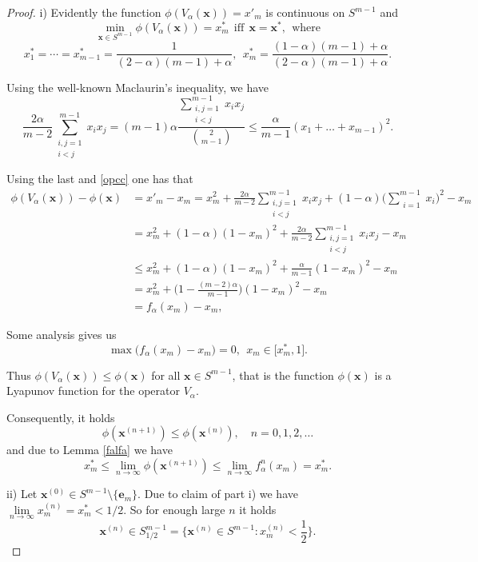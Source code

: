 \documentclass[11pt,reqno]{amsart}
\numberwithin{equation}{section} \setcounter{tocdepth}{1}
\begin{document}
\begin{proof}  i) Evidently the function $\phi(V_\alpha(\mathbf{x}))=x'_m$ is continuous on $S^{m-1}$ and
\[\min\limits_{\mathbf{x}\in S^{m-1}} \phi(V_\alpha(\mathbf{x})) =x_m^* \ \ \text{iff} \ \  \mathbf{x}=\mathbf{x}^*, \ \ \text{where}\]
\[x_1^*=\cdots=x_{m-1}^* =\frac{1}{ (2-\alpha)(m-1)+\alpha}, \ \ x_m^*=\frac{(1-\alpha)(m-1)+\alpha}{ (2-\alpha)(m-1)+\alpha}.\]

Using the well-known Maclaurin's inequality, we have
\[\frac{2\alpha}{m-2} \displaystyle\sum_{\substack{i,j=1\\ i<j}}^{m-1} x_ix_j =
(m-1)\alpha \frac{\displaystyle\sum_{\substack{i,j=1\\ i<j}}^{m-1} x_ix_j}{
\binom{2}{m-1}} \leq \frac{\alpha}{ m-1} (x_1+\dots+x_{m-1})^2.\]

Using the last and \eqref{opcc} one has that
\begin{align*}
\phi(V_\alpha(\mathbf{x}))-\phi(\mathbf{x})&=x'_m-x_m= x_m^2+
               \frac{2\alpha}{m-2}\displaystyle\sum_{\substack{i,j=1\\ i<j}}^{m-1} x_ix_j +
               (1-\alpha) \Big(\displaystyle\sum_{\substack{i=1}}^{m-1} x_i\Big)^2-x_m\\
&= x_m^2+(1-\alpha) (1-x_m)^2 +  \frac{2\alpha}{m-2}\displaystyle\sum_{\substack{i,j=1\\ i<j}}^{m-1} x_ix_j-x_m\\
&\leq x_m^2+(1-\alpha) (1-x_m)^2 +  \frac{\alpha}{m-1}(1-x_m)^2-x_m\\
&=x_m^2+\Big(1-\frac{(m-2)\alpha}{m-1}\Big) (1-x_m)^2-x_m\\
&= f_\alpha(x_m)-x_m,
\end{align*}

Some analysis gives us
\[\max  \Big(f_\alpha(x_m)-x_m\Big) =0, \ \ x_m\in \Big[x^*_m,1\Big]. \]


Thus $\phi(V_\alpha(\mathbf{x}))\leq \phi(\mathbf{x}) $ for all $\mathbf{x}\in S^{m-1}$, that is
the function $\phi(\mathbf{x})$ is a Lyapunov function for the operator $V_\alpha$.

Consequently, it  holds
\[\phi(\mathbf{x}^{(n+1)}) \leq \phi(\mathbf{x}^{(n)}), \quad n=0,1,2,\dots   \]
and  due to Lemma \ref{falfa}  we have
\begin{equation}\label{mcorr}
x_m^* \leq \lim\limits_{n\rightarrow\infty} \phi(\mathbf{x}^{(n+1)})
\leq \lim\limits_{n\rightarrow\infty} f^n_\alpha(x_m)=x_m^*.
\end{equation}


ii) Let $\mathbf{x}^{(0)}\in S^{m-1}\setminus \{\mathbf{e}_m\}$. Due to claim of  part i) we have $ \lim\limits_{n\rightarrow\infty} x_m^{(n)}=x_m^*<1/2$. So for enough large $n$ it  holds
\[\mathbf{x}^{(n)}\in S^{m-1}_{1/2}=\{\mathbf{x}^{(n)}\in S^{m-1}: x_m^{(n)}<\frac{1}{2}\}. \]




\end{proof}
\end{document}
